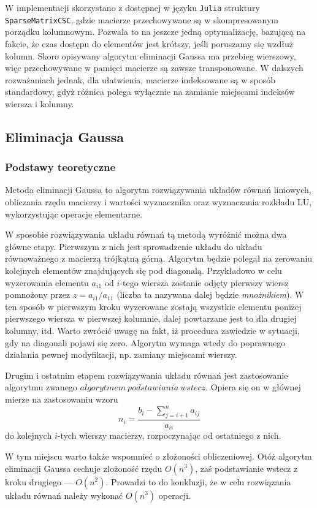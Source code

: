 \documentclass{classrep}
\begin{document}
	W implementacji skorzystano z dostępnej w języku \texttt{Julia} struktury \texttt{SparseMatrixCSC}, gdzie macierze przechowywane są w skompresowanym porządku kolumnowym. Pozwala to na jeszcze jedną optymalizację, bazującą na fakcie, że czas dostępu do elementów jest krótszy, jeśli poruszamy się wzdłuż kolumn. Skoro opisywany algorytm eliminacji Gaussa ma przebieg wierszowy, więc przechowywane w pamięci macierze są zawsze transponowane. W dalszych rozważaniach jednak, dla ułatwienia, macierze indeksowane są w sposób standardowy, gdyż różnica polega wyłącznie na zamianie miejscami indeksów wiersza i kolumny.
	
	\subsection{Eliminacja Gaussa}
		\subsubsection{Podstawy teoretyczne}
		Metoda eliminacji Gaussa to algorytm rozwiązywania układów równań liniowych, obliczania rzędu macierzy i wartości wyznacznika oraz wyznaczania rozkładu LU, wykorzystując operacje elementarne. 
		
		W sposobie rozwiązywania układu równań tą metodą wyróżnić można dwa główne etapy. Pierwszym z nich jest sprowadzenie układu do układu równoważnego z macierzą trójkątną górną. Algorytm będzie polegał na zerowaniu kolejnych elementów znajdujących się pod diagonalą. Przykładowo w celu wyzerowania elementu $a_{i1}$ od $i$-tego wiersza zostanie odjęty pierwszy wiersz  pomnożony przez $z=a_{i1}/a_{11}$ (liczba ta nazywana dalej będzie \emph{mnożnikiem}). W ten sposób w pierwszym kroku wyzerowane zostają wszystkie elementu poniżej pierwszego wiersza w pierwszej kolumnie, dalej powtarzane jest to dla drugiej kolumny, itd. Warto zwrócić uwagę na fakt, iż procedura zawiedzie w sytuacji, gdy na diagonali pojawi się zero. Algorytm wymaga wtedy do poprawnego działania pewnej modyfikacji, np. zamiany miejscami wierszy.
		
		Drugim i ostatnim etapem rozwiązywania układu równań jest zastosowanie algorytmu zwanego $algorytmem~podstawiania~wstecz$. Opiera się on w głównej mierze na zastosowaniu wzoru
			$$n_i = \frac{b_i-\sum_{j=i+1}^n{a_{ij}}}{a_{ii}}$$
		do kolejnych $i$-tych wierszy macierzy, rozpoczynając od ostatniego z nich.
		
		W tym miejscu warto także wspomnieć o złożoności obliczeniowej. Otóż algorytm eliminacji Gaussa cechuje złożoność rzędu $O(n^3)$, zaś podstawianie wstecz z kroku drugiego --- $O(n^2)$. Prowadzi to do konkluzji, że w celu rozwiązania układu równań należy wykonać $O(n^3)$ operacji.
		
\end{document}

